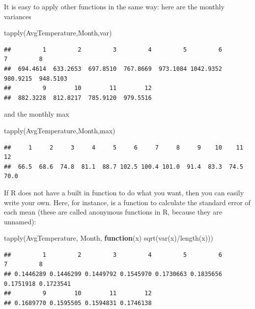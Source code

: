 \documentclass[
]{book}
\newenvironment{Shaded}{\begin{snugshade}}{\end{snugshade}}
\newcommand{\ControlFlowTok}[1]{\textcolor[rgb]{0.13,0.29,0.53}{\textbf{#1}}}
\newcommand{\FunctionTok}[1]{\textcolor[rgb]{0.00,0.00,0.00}{#1}}
\newcommand{\NormalTok}[1]{#1}
\newcommand{\SpecialCharTok}[1]{\textcolor[rgb]{0.00,0.00,0.00}{#1}}
\begin{document}
It is easy to apply other functions in the same way: here are the monthly variances

\begin{Shaded}
\begin{Highlighting}[]
\FunctionTok{tapply}\NormalTok{(AvgTemperature,Month,var)}
\end{Highlighting}
\end{Shaded}

\begin{verbatim}
##         1         2         3         4         5         6         7         8 
##  694.4614  633.2653  697.8510  767.8669  973.1084 1042.9352  980.9215  948.5103 
##         9        10        11        12 
##  882.3228  812.8217  785.9120  979.5516
\end{verbatim}

and the monthly max

\begin{Shaded}
\begin{Highlighting}[]
\FunctionTok{tapply}\NormalTok{(AvgTemperature,Month,max)}
\end{Highlighting}
\end{Shaded}

\begin{verbatim}
##     1     2     3     4     5     6     7     8     9    10    11    12 
##  66.5  68.6  74.8  81.1  88.7 102.5 100.4 101.0  91.4  83.3  74.5  70.0
\end{verbatim}

If R does not have a built in function to do what you want, then you can easily write your own. Here, for instance, is a function to calculate the standard error of each mean (these are called anonymous functions in R, because they are unnamed):

\begin{Shaded}
\begin{Highlighting}[]
\FunctionTok{tapply}\NormalTok{(AvgTemperature, Month,  }\ControlFlowTok{function}\NormalTok{(x) }\FunctionTok{sqrt}\NormalTok{(}\FunctionTok{var}\NormalTok{(x)}\SpecialCharTok{/}\FunctionTok{length}\NormalTok{(x)))}
\end{Highlighting}
\end{Shaded}

\begin{verbatim}
##         1         2         3         4         5         6         7         8 
## 0.1446289 0.1446299 0.1449792 0.1545970 0.1730663 0.1835656 0.1751918 0.1723541 
##         9        10        11        12 
## 0.1689770 0.1595505 0.1594831 0.1746138
\end{verbatim}
\end{document}

